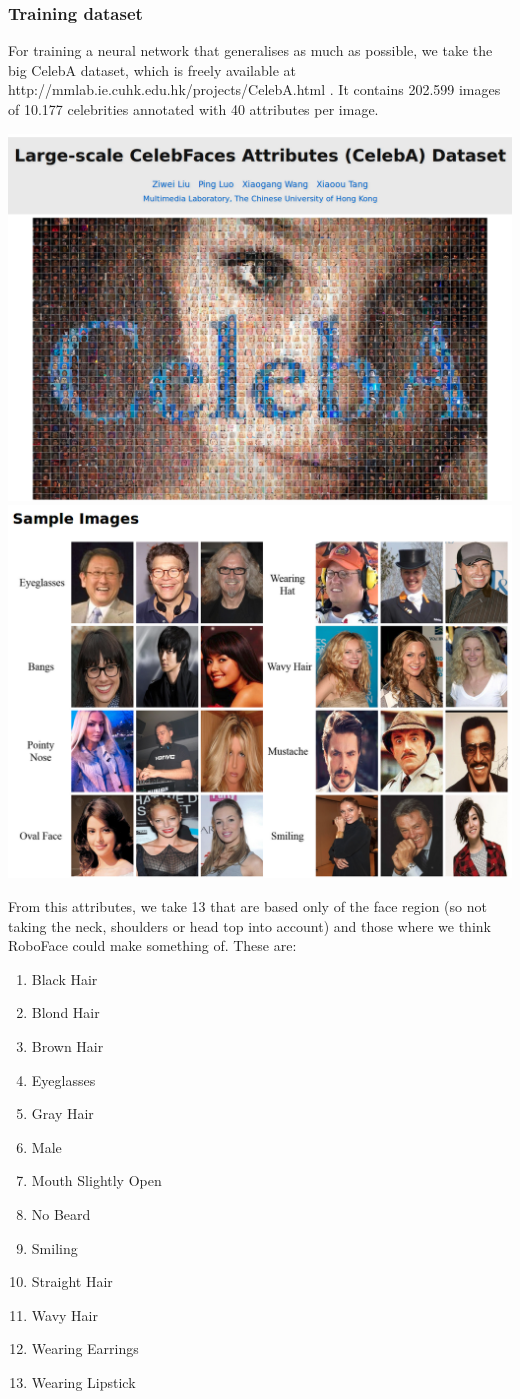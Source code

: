 \documentclass[12.5pt]{scrartcl}
\begin{document}
	\subsubsection{Training dataset}
	For training a neural network that generalises as much as possible, we take the big CelebA dataset, which is freely available at http://mmlab.ie.cuhk.edu.hk/projects/CelebA.html . It contains 202.599 images of 10.177 celebrities annotated with 40 attributes per image.

	\includegraphics[width=0.5\linewidth]{images/CelebA} \\
	\includegraphics[width=0.5\linewidth]{images/CelebAExamples}
	
	From this attributes, we take 13 that are based only of the face region (so not taking the neck, shoulders or head top into account) and those where we think RoboFace could make something of. These are:
		\begin{enumerate}
			\item Black Hair
			\item Blond Hair
			\item Brown Hair
			\item Eyeglasses
			\item Gray Hair
			\item Male
			\item Mouth Slightly Open
			\item No Beard
			\item Smiling
			\item Straight Hair
			\item Wavy Hair
			\item Wearing Earrings
			\item Wearing Lipstick
		\end{enumerate}
\end{document}
